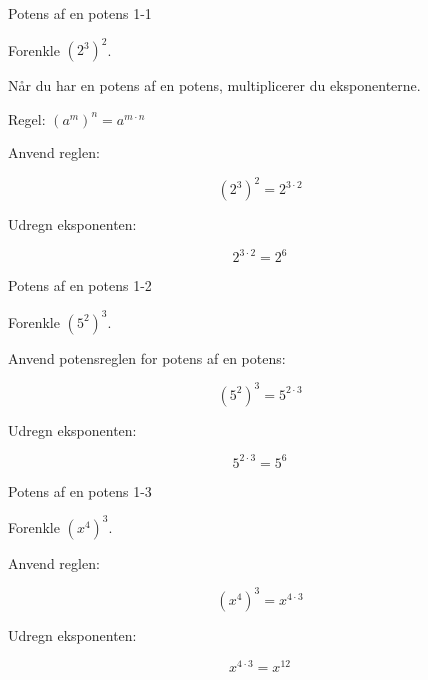 \documentclass{article}
\begin{document}

\tableofcontents
\newpage

\begin{exercise}{Potens af en potens 1-1}

Forenkle $(2^3)^2$.


\hint

Når du har en potens af en potens, multiplicerer du eksponenterne.

\hint

Regel: $(a^m)^n = a^{m \cdot n}$

\hint

Anvend reglen:

\hint
\[
(2^3)^2 = 2^{3 \cdot 2}
\]

\hint

Udregn eksponenten:

\hint
\[
2^{3 \cdot 2} = 2^6
\]

\end{exercise}

\newpage

\begin{exercise}{Potens af en potens 1-2}

Forenkle $(5^2)^3$.


\hint

Anvend potensreglen for potens af en potens:

\hint
\[
(5^2)^3 = 5^{2 \cdot 3}
\]

\hint

Udregn eksponenten:

\hint
\[
5^{2 \cdot 3} = 5^6
\]

\end{exercise}

\newpage

\begin{exercise}{Potens af en potens 1-3}

Forenkle $(x^4)^3$.


\hint

Anvend reglen:

\hint
\[
(x^4)^3 = x^{4 \cdot 3}
\]

\hint

Udregn eksponenten:

\hint
\[
x^{4 \cdot 3} = x^{12}
\]

\end{exercise}
\end{document}
